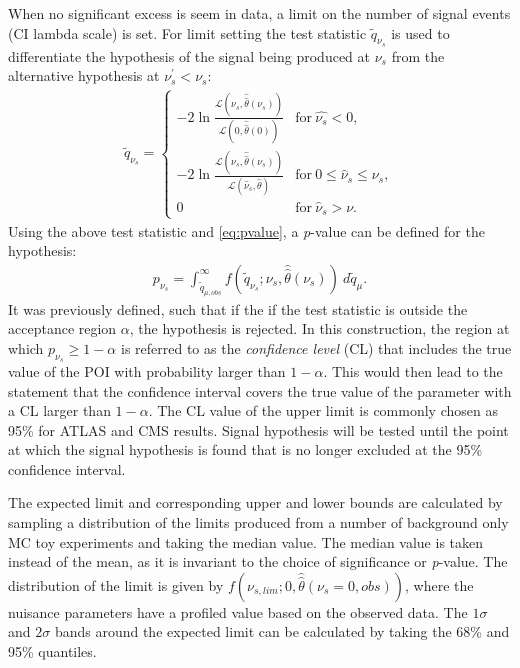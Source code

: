 When no significant excess is seem in data, a limit on the number of signal events (CI lambda scale) is set. For limit setting the test statistic $\tilde{q}_{\nu_s}$ is used to differentiate the hypothesis of the signal being produced at $\nu_s$ from the alternative hypothesis at $\nu_s^\prime < \nu_s$:
\begin{equation}
    \label{eq:limitTestStat}
    \begin{aligned}
    \tilde{q}_{\nu_s} = \begin{cases}
        -2\ln\frac{\mathcal{L}(\nu_s,\hat{\hat{\theta}}(\nu_s))}{\mathcal{L}(0,\hat{\hat{\theta}}(0))} & \mathrm{for }~\hat{\nu_s} < 0, \\
        -2\ln\frac{\mathcal{L}(\nu_s,\hat{\hat{\theta}}(\nu_s))}{\mathcal{L}(\hat{\nu}_s,\hat{\theta})} & \mathrm{for }~0 \leq \hat{\nu}_s \leq \nu_s, \\
        0          & \mathrm{for }~\hat{\nu}_s > \nu.
    \end{cases}
    \end{aligned}
\end{equation}
Using the above test statistic and \cref{eq:pvalue}, a \emph{p}-value can be defined for the hypothesis:
\begin{equation}
    \label{eq:pvalue_sb}
    \begin{aligned}
        p_{\nu_s} = \int_{\tilde{q}_{\mu,obs}}^\infty f(\tilde{q}_{\nu_s};\nu_s,\hat{\hat{\theta}}(\nu_s))~d\tilde{q}_\mu.
    \end{aligned}
\end{equation}
It was previously defined, such that if the if the test statistic is outside the acceptance region $\alpha$, the hypothesis is rejected. In this construction, the region at which $p_{\nu_s} \geq 1 - \alpha$ is referred to as the \emph{confidence level} (CL) that includes the true value of the POI with probability larger than $1-\alpha$. This would then lead to the statement that the confidence interval covers the true value of the parameter with a CL larger than $1-\alpha$. The CL value of the upper limit is commonly chosen as 95\% for ATLAS and CMS results. Signal hypothesis will be tested until the point at which the signal hypothesis is found that is no longer excluded at the 95\% confidence interval. 

The expected limit and corresponding upper and lower bounds are calculated by sampling a distribution of the limits produced from a number of background only MC toy experiments and taking the median value. The median value is taken instead of the mean, as it is invariant to the choice of significance or \emph{p}-value. The distribution of the limit is given by $f(\nu_{s,lim};0,\hat{\hat{\theta}}(\nu_s = 0,obs))$, where the nuisance parameters have a profiled value based on the observed data. The $1\sigma$ and $2\sigma$ bands around the expected limit can be calculated by taking the 68\% and 95\% quantiles. 

